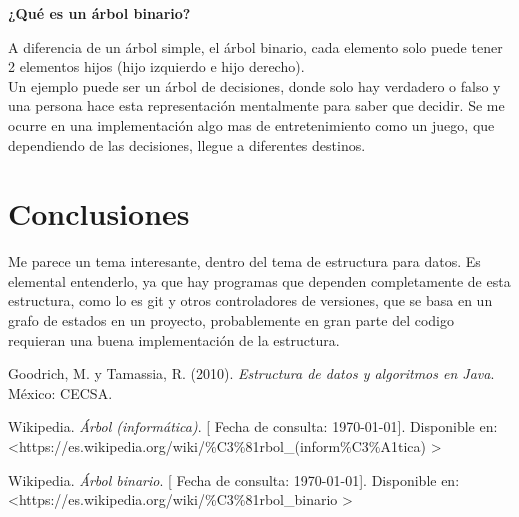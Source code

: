 \documentclass[spanish,12pt,letterpapper]{article}
\begin{document}
	\textbf{¿Qué es un árbol binario?\\}
	
	A diferencia de un árbol simple, el árbol binario, cada elemento solo puede tener 2 elementos hijos (hijo izquierdo e hijo derecho). \\
	
	Un ejemplo puede ser un árbol de decisiones, donde solo hay verdadero o falso y una persona hace esta representación mentalmente para saber que decidir. Se me ocurre en una implementación algo mas de entretenimiento como un juego, que dependiendo de las decisiones, llegue a diferentes destinos.
	
	\section{Conclusiones \\}
	Me parece un tema interesante, dentro del tema de estructura para datos. Es elemental entenderlo, ya que hay programas que dependen completamente de esta estructura, como lo es git y otros controladores de versiones, que se basa en un grafo de estados en un proyecto, probablemente en gran parte del codigo requieran una buena implementación de la estructura.
	
	
	
	\pagebreak
	\begin{thebibliography}{9}
		 Goodrich, M. y Tamassia, R. (2010).
		\emph{Estructura de datos y algoritmos en Java}. México: CECSA.
		
		 Wikipedia. 
		\emph{Árbol (informática)}.  {[} Fecha de consulta: \today {]}. Disponible en: \textless https://es.wikipedia.org/wiki/\%C3\%81rbol\_(inform\%C3\%A1tica) \textgreater
		
		 Wikipedia. 
		\emph{Árbol binario}.  {[} Fecha de consulta: \today {]}. Disponible en: \textless https://es.wikipedia.org/wiki/\%C3\%81rbol\_binario \textgreater

	\end{thebibliography}
	
\end{document}
